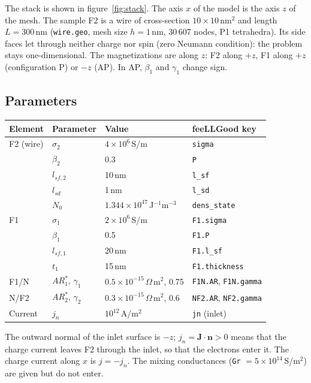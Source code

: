 \documentclass[11pt,a4paper]{article}
\begin{document}
The stack is shown in figure~\ref{fig:stack}. The axis $x$ of the model is
the axis $z$ of the mesh. The sample F2 is a wire of cross-section
$10\times10$\,nm$^2$ and length $L = 300$\,nm (\texttt{wire.geo}, mesh size
$h = 1$\,nm, 30\,607 nodes, P1 tetrahedra). Its side faces let through
neither charge nor spin (zero Neumann condition): the problem stays
one-dimensional. The magnetizations are along $z$: F2 along $+z$, F1
along $+z$ (configuration P) or $-z$ (AP). In AP, $\beta_1$ and $\gamma_1$
change sign.

\subsection{Parameters}

\begin{center}
\renewcommand{\arraystretch}{1.2}
\begin{tabular}{llll}
  \toprule
  Element & Parameter & Value & feeLLGood key \\
  \midrule
  F2 (wire) & $\sigma_2$ & $4\times10^6$\,S/m & \texttt{sigma} \\
    & $\beta_2$ & 0.3 & \texttt{P} \\
    & $l_{sf,2}$ & 10\,nm & \texttt{l\_sf} \\
    & $l_{sd}$ & 1\,nm & \texttt{l\_sd} \\
    & $N_0$ & $1.344\times10^{47}$\,J$^{-1}$m$^{-3}$ & \texttt{dens\_state} \\
  F1 & $\sigma_1$ & $2\times10^6$\,S/m & \texttt{F1.sigma} \\
    & $\beta_1$ & 0.5 & \texttt{F1.P} \\
    & $l_{sf,1}$ & 20\,nm & \texttt{F1.l\_sf} \\
    & $t_1$ & 15\,nm & \texttt{F1.thickness} \\
  F1/N & $AR_1^*$, $\gamma_1$ & $0.5\times10^{-15}\,\Omega\,$m$^2$, 0.75
    & \texttt{F1N.AR}, \texttt{F1N.gamma} \\
  N/F2 & $AR_2^*$, $\gamma_2$ & $0.3\times10^{-15}\,\Omega\,$m$^2$, 0.6
    & \texttt{NF2.AR}, \texttt{NF2.gamma} \\
  Current & $j_n$ & $10^{12}$\,A/m$^2$ & \texttt{jn} (inlet) \\
  \bottomrule
\end{tabular}
\end{center}

The outward normal of the inlet surface is $-z$; $j_n = \bm{J}\cdot\bm{n}
> 0$ means that the charge current leaves F2 through the inlet, so that
the electrons enter it. The charge current along $x$ is $j = -j_n$. The
mixing conductances (\texttt{Gr} $= 5\times10^{14}$\,S/m$^2$) are given
but do not enter.
\end{document}
